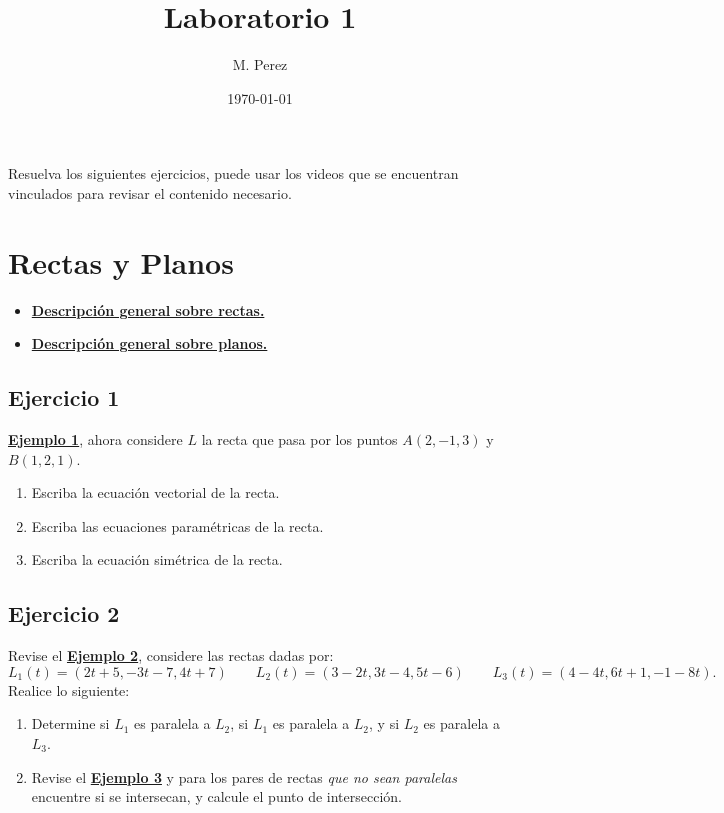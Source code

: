 \documentclass[11pt]{article}
\author{M. Perez}
\date{\today}
\title{Laboratorio 1}
\begin{document}
\maketitle
\tableofcontents

Resuelva los siguientes ejercicios, puede usar los videos que se encuentran vinculados para revisar el contenido necesario.


\section{Rectas y Planos}
\label{sec:orgf635d09}

\begin{itemize}
\item \textbf{\href{https://vimeo.com/574240696}{Descripción general sobre rectas.}}
\item \textbf{\href{https://vimeo.com/574240985}{Descripción general sobre planos.}}
\end{itemize}

\subsection{Ejercicio 1}
\label{sec:orga603bae}

\textbf{\href{https://vimeo.com/574240748}{Ejemplo 1}}, ahora considere \(L\) la recta que pasa por los puntos \(A(2, -1, 3)\) y \(B(1, 2, 1)\).
\begin{enumerate}
\item Escriba la ecuación vectorial de la recta.
\item Escriba las ecuaciones paramétricas de la recta.
\item Escriba la ecuación simétrica de la recta.
\end{enumerate}


\subsection{Ejercicio 2}
\label{sec:org45221e4}

Revise el \textbf{\href{https://vimeo.com/574240843}{Ejemplo 2}}, considere las rectas dadas por:
\[
    L_1(t) = (2t + 5, -3t - 7, 4t + 7)
    \qquad
    L_2(t) = (3 - 2t, 3t - 4, 5t - 6)
    \qquad
    L_3(t) = (4 - 4t, 6t + 1, -1 - 8t).
  \]
Realice lo siguiente:
\begin{enumerate}
\item Determine si \(L_1\) es paralela a \(L_2\), si \(L_1\) es paralela a \(L_2\), y si \(L_2\) es paralela a \(L_3\).
\item Revise el \textbf{\href{https://vimeo.com/574240895}{Ejemplo 3}} y para los pares de rectas \emph{que no sean paralelas} encuentre si se intersecan, y calcule el punto de intersección.
\end{enumerate}
\end{document}
